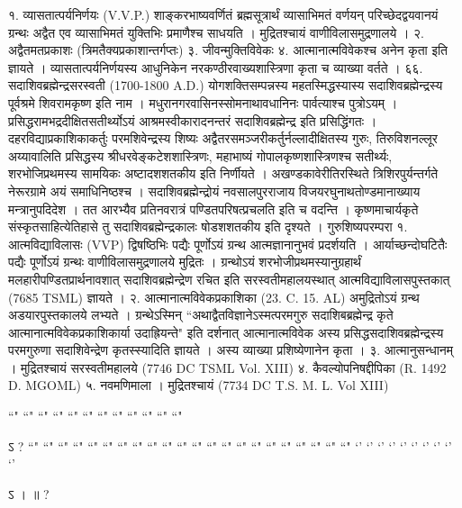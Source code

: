 १. व्यासतात्पर्यनिर्णयः (V.V.P.)
शाङ्करभाष्यवर्णितं ब्रह्मसूत्रार्थं व्यासाभिमतं वर्णयन् परिच्छेदद्वयवानयं ग्रन्थः अद्वैत एव व्यासाभिमतं युक्तिभिः प्रमाणैश्च साधयति । मुद्रितश्चायं वाणीविलासमुद्रणालये ।
२. अद्वैतमतप्रकाशः (त्रिमतैक्यप्रकाशान्तर्गप्तः)
३. जीवन्मुक्तिविवेकः 
४. आत्मानात्मविवेकश्च अनेन कृता इति ज्ञायते । व्यासतात्पर्यनिर्णयस्य आधुनिकेन नरकण्ठीरवाख्यशास्त्रिणा कृता च व्याख्या वर्तते ।
६६. सदाशिवब्रह्मेन्द्रसरस्वती (1700-1800 A.D.)
योगशक्तिसम्पन्नस्य महतस्मिद्धस्यास्य सदाशिवब्रह्मेन्द्रस्य पूर्वश्रमे शिवरामकृष्ण इति नाम । मधुरानगरवासिनस्सोमनाथावधानिनः पार्वत्याश्च पुत्रोऽयम् । प्रसिद्धरामभद्रदीक्षितसतीर्थ्योऽयं आश्रमस्वीकारादनन्तरं सदाशिवब्रह्मेन्द्र इति प्रसिद्धिंगतः । दहरविद्याप्रकाशिकाकर्तुः परमशिवेन्द्रस्य शिष्यः अद्वैतरसमञ्जरीकर्तुर्नल्लादीक्षितस्य गुरुः, तिरुविशनल्लूर अय्यावालिति प्रसिद्धस्य श्रीधरवेङ्कटेशशास्त्रिणः, महाभाष्यं गोपालकृष्णशास्त्रिणश्च सतीर्थ्यः, शरभोजिप्रथमस्य सामयिकः अष्टादशशतकीय इति निर्णीयते । अखण्डकावेरीतिरस्थिते त्रिशिरपुर्यन्तर्गते नेरूरग्रामे अयं समाधिनिष्ठश्च । सदाशिवब्रह्मेन्द्रोयं नवसालपुरराजाय विजयरघुनाथतोण्डमानाख्याय मन्त्रानुपदिदेश । तत आरभ्यैव प्रतिनवरात्रं पण्डितपरिषत्प्रचलति इति च वदन्ति ।
कृष्णमाचार्यकृते संस्कृतसाहित्येतिहासे तु सदाशिवब्रह्मेन्द्रकालः षोडशशतकीय इति दृश्यते ।
गुरुशिष्यपरम्परा
१. आत्मविद्याविलासः (VVP)
द्विषष्ठिभिः पद्यैः पूर्णोऽयं ग्रन्थ आत्मज्ञानानुभवं प्रदर्शयति । आर्याच्छन्दोघटितैः पद्यैः पूर्णोऽयं ग्रन्थः वाणीविलासमुद्रणालये मुद्रितः । ग्रन्थोऽयं शरभोजीप्रथमस्यानुग्रहार्थं मलहारीपण्डितप्रार्थनावशात् सदाशिवब्रह्मेन्द्रेण रचित इति सरस्वतीमहालयस्थात् आत्मविद्याविलासपुस्तकात् (7685 TSML) ज्ञायते ।
२. आत्मानात्मविवेकप्रकाशिका (23. C. 15. AL)
अमुद्रितोऽयं ग्रन्थ अडयारपुस्तकालये लभ्यते । ग्रन्थेऽस्मिन् ``अथाद्वैतविज्ञानेऽस्मत्परमगुरु सदाशिबब्रह्मेन्द्र कृते आत्मानात्मविवेकप्रकाशिकार्या उदाह्रियन्ते" इति दर्शनात् आत्मानात्मविवेक अस्य प्रसिद्धसदाशिवब्रह्मेन्द्रस्य परमगुरुणा सदाशिवेन्द्रेण कृतस्स्यादिति ज्ञायते । अस्य व्याख्या प्रशिष्येणानेन कृता ।
३. आत्मानुसन्धानम् । मुद्रितश्चायं सरस्वतीमहालये (7746 DC TSML Vol. XIII)
४. कैवल्योपनिषद्दीपिका (R. 1492 D. MGOML)
५. नवमणिमाला । मुद्रितश्चायं (7734 DC T.S. M. L. Vol XIII)

 ``" ``" ``" ``" ``" ``" ``" ``" ``" ``" ``" ``" 

ऽ  ?
``" ``" ``" ``" ``" ``" ``" ``" ``" ``" ``" ``" ``" ``" ``" ``" ``" ``" ``" ``" ``" ``"
`' `' `' `' `' `' `' `' `' `' 

ऽ  ।   ॥ ?
